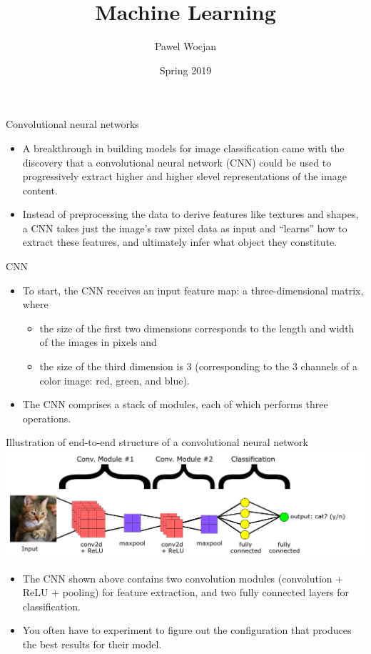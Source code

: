 \documentclass{beamer}
\title[ML]{Machine Learning}
\author{Pawel Wocjan}
\institute{University of Central Florida}
\date{Spring 2019}
\begin{document}
\begin{frame}
  \titlepage
\end{frame}

\begin{frame}{Convolutional neural networks}
\begin{itemize}
\item A breakthrough in building models for image classification came with the discovery that a convolutional neural network (CNN) could be used to progressively extract higher and higher slevel representations of the image content. 
\item Instead of preprocessing the data to derive features like textures and shapes, a CNN takes just the image's raw pixel data as input and ``learns'' how to extract these features, and ultimately infer what object they constitute.
\end{itemize}
\end{frame}

\begin{frame}{CNN}
\begin{itemize}
\item To start, the CNN receives an input feature map: a three-dimensional matrix, where
\begin{itemize}
\item the size of the first two dimensions corresponds to the length and width of the images in pixels and
\item the size of the third dimension is 3 (corresponding to the 3 channels of a color image: red, green, and blue). 
\end{itemize}
\item The CNN comprises a stack of modules, each of which performs three operations.
\end{itemize}
\end{frame}

\begin{frame}{Illustration of end-to-end structure of a convolutional neural network}
\medskip
\includegraphics[width=1.1\textwidth]{images/cnn_architecture.png}
\begin{itemize}
\item The CNN shown above contains two convolution modules (convolution + ReLU + pooling) for feature extraction, and two fully connected layers for classification.
\item You often have to experiment to figure out the configuration that produces the best results for their model.
\end{itemize}
\end{frame}
\end{document}
